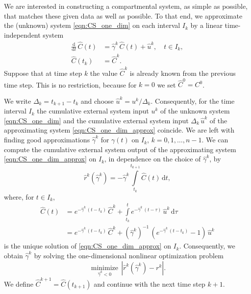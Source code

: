 \documentclass[11pt,a4paper]{article}
\newcommand{\deriv}[1]{\frac{\mathrm{d}}{\mathrm{d}#1}}
\newcommand{\dd}[1]{\,\mathrm{d}#1}
\newcommand{\intl}{\int\limits}
\begin{document}
        We are interested in constructing a compartmental system, as simple as possible, that matches these given data as well as possible.
        To that end, we approximate the (unknown) system \eqref{eqn:CS_one_dim} on each interval $I_k$ by a linear time-independent system
        \begin{equation}\label{eqn:CS_one_dim_approx}
            \begin{aligned}
                \deriv{t}\,\widehat{C}(t) &= \widehat{\gamma}^k\,\widehat{C}(t) + \widehat{u}^k,\quad t\in I_k,\\
                \widehat{C}(t_k) &= \widehat{C}^k.
            \end{aligned}
        \end{equation}
        Suppose that at time step $k$ the value $\widehat{C}^k$ is already known from the previous time step.
        This is no restriction, because for $k=0$ we set $\widehat{C}^0=C^0$.
        
        We write $\Delta_k=t_{k+1}-t_k$ and choose $\widehat{u}^k=u^k/\Delta_k$.
        Consequently, for the time interval $I_k$ the cumulative external system input $u^k$ of the unknown system \eqref{eqn:CS_one_dim} and the cumulative external system input $\Delta_k\,\widehat{u}^k$ of the approximating system \eqref{eqn:CS_one_dim_approx} coincide.
        We are left with finding good approximations $\widehat{\gamma}^k$ for $\gamma(t)$ on $I_k$, $k=0,1,\ldots,n-1$.
        We can compute the cumulative external system output of the approximating system \eqref{eqn:CS_one_dim_approx} on $I_k$, in dependence on the choice of $\widehat{\gamma}^k$, by
        \begin{equation*}
            \widehat{r}^k(\widehat{\gamma}^k) = -\widehat{\gamma}^k\intl_{t_k}^{t_{k+1}} \widehat{C}(t)\dd{t},
        \end{equation*}
        where, for $t\in I_k$,
        \begin{align*}
            \widehat{C}(t) &= e^{-\widehat{\gamma}^k\,(t-t_k)}\,\widehat{C}^k + \intl_{t_k}^t e^{-\widehat{\gamma}^k\,(t-\tau)}\,\widehat{u}^k\dd{\tau}\\
            &= e^{-\widehat{\gamma}^k\,(t-t_k)}\,\widehat{C}^k + (\widehat{\gamma}^k)^{-1}\,(e^{-\widehat{\gamma}^k\,(t-t_k)}-1)\,\widehat{u}^k
        \end{align*}
        is the unique solution of \eqref{eqn:CS_one_dim_approx} on $I_k$.
        Consequently, we obtain $\widehat{\gamma}^k$ by solving the one-dimensional nonlinear optimization problem
        \begin{equation*}
            \underset{\widehat{\gamma}^k<0}{\operatorname{minimize}}\,|\widehat{r}^k(\widehat{\gamma}^k)-r^k|.
        \end{equation*}
        We define $\widehat{C}^{k+1}=\widehat{C}(t_{k+1})$ and continue with the next time step $k+1$.
        
\end{document}
